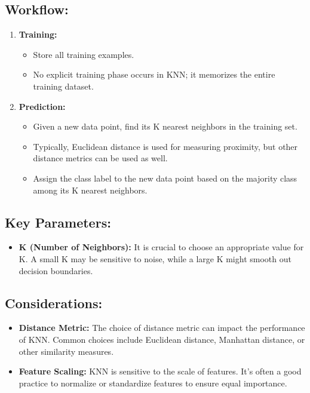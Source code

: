 \documentclass[9pt,twocolumn]{paper-template}
\begin{document}
\subsection*{Workflow:}
\begin{enumerate}
	\item \textbf{Training:}
	\begin{itemize}
		\item Store all training examples.
		\item No explicit training phase occurs in KNN; it memorizes the entire training dataset.
	\end{itemize}
	
	\item \textbf{Prediction:}
	\begin{itemize}
		\item Given a new data point, find its K nearest neighbors in the training set.
		\item Typically, Euclidean distance is used for measuring proximity, but other distance metrics can be used as well.
		\item Assign the class label to the new data point based on the majority class among its K nearest neighbors.
	\end{itemize}
\end{enumerate}

\subsection*{Key Parameters:}
\begin{itemize}
	\item \textbf{K (Number of Neighbors):} It is crucial to choose an appropriate value for K. A small K may be sensitive to noise, while a large K might smooth out decision boundaries.
\end{itemize}

\subsection*{Considerations:}
\begin{itemize}
	\item \textbf{Distance Metric:} The choice of distance metric can impact the performance of KNN. Common choices include Euclidean distance, Manhattan distance, or other similarity measures.
	
	\item \textbf{Feature Scaling:} KNN is sensitive to the scale of features. It's often a good practice to normalize or standardize features to ensure equal importance.
\end{itemize}
\end{document}
